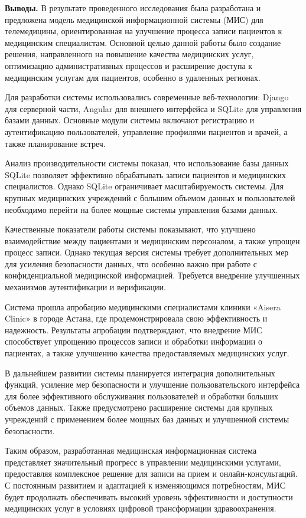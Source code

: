 {\bfseries Выводы.} В результате проведенного исследования была разработана
и предложена модель медицинской информационной системы (МИС) для
телемедицины, ориентированная на улучшение процесса записи пациентов к
медицинским специалистам. Основной целью данной работы было создание
решения, направленного на повышение качества медицинских услуг,
оптимизацию административных процессов и расширение доступа к
медицинским услугам для пациентов, особенно в удаленных регионах.

Для разработки системы использовались современные веб-технологии: Django
для серверной части, Angular для внешнего интерфейса и SQLite для
управления базами данных. Основные модули системы включают регистрацию и
аутентификацию пользователей, управление профилями пациентов и врачей, а
также планирование встреч.

Анализ производительности системы показал, что использование базы данных
SQLite позволяет эффективно обрабатывать записи пациентов и медицинских
специалистов. Однако SQLite ограничивает масштабируемость системы. Для
крупных медицинских учреждений с большим объемом данных и пользователей
необходимо перейти на более мощные системы управления базами данных.

Качественные показатели работы системы показывают, что улучшено
взаимодействие между пациентами и медицинским персоналом, а также
упрощен процесс записи. Однако текущая версия системы требует
дополнительных мер для усиления безопасности данных, что особенно важно
при работе с конфиденциальной медицинской информацией. Требуется
внедрение улучшенных механизмов аутентификации и верификации.

Система прошла апробацию медицинскими специалистами клиники «Aisera
Clinic» в городе Астана, где продемонстрировала свою эффективность и
надежность. Результаты апробации подтверждают, что внедрение МИС
способствует упрощению процессов записи и обработки информации о
пациентах, а также улучшению качества предоставляемых медицинских услуг.

В дальнейшем развитии системы планируется интеграция дополнительных
функций, усиление мер безопасности и улучшение пользовательского
интерфейса для более эффективного обслуживания пользователей и обработки
больших объемов данных. Также предусмотрено расширение системы для
крупных учреждений с применением более мощных баз данных и улучшенной
системы безопасности.

Таким образом, разработанная медицинская информационная система
представляет значительный прогресс в управлении медицинскими услугами,
предоставляя комплексное решение для записи на прием и
онлайн-консультаций. С постоянным развитием и адаптацией к изменяющимся
потребностям, МИС будет продолжать обеспечивать высокий уровень
эффективности и доступности медицинских услуг в условиях цифровой
трансформации здравоохранения.

